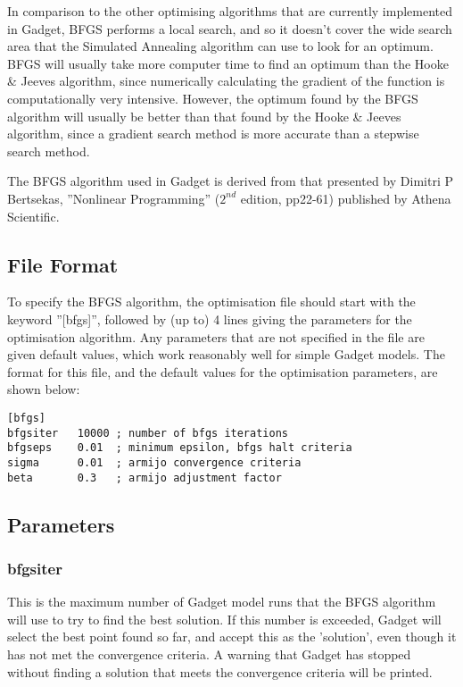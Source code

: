 \documentclass[10pt,twoside]{book}
\begin{document}
\bigskip
In comparison to the other optimising algorithms that are currently implemented in Gadget, BFGS performs a local search, and so it doesn't cover the wide search area that the Simulated Annealing algorithm can use to look for an optimum.  BFGS will usually take more computer time to find an optimum than the Hooke \& Jeeves algorithm, since numerically calculating the gradient of the function is computationally very intensive.  However, the optimum found by the BFGS algorithm will usually be better than that found by the Hooke \& Jeeves algorithm, since a gradient search method is more accurate than a stepwise search method.

\bigskip
The BFGS algorithm used in Gadget is derived from that presented by Dimitri P Bertsekas, ''Nonlinear Programming'' ($2^{nd}$ edition, pp22-61) published by Athena Scientific.

\subsection{File Format}\label{subsec:bfgsfile}
To specify the BFGS algorithm, the optimisation file should start with the keyword ''[bfgs]'', followed by (up to) 4 lines giving the parameters for the optimisation algorithm.  Any parameters that are not specified in the file are given default values, which work reasonably well for simple Gadget models.  The format for this file, and the default values for the optimisation parameters, are shown below:

{\small\begin{verbatim}
[bfgs]
bfgsiter   10000 ; number of bfgs iterations
bfgseps    0.01  ; minimum epsilon, bfgs halt criteria
sigma      0.01  ; armijo convergence criteria
beta       0.3   ; armijo adjustment factor
\end{verbatim}}

\subsection{Parameters}\label{subsec:bfgspar}
\subsubsection{bfgsiter}
This is the maximum number of Gadget model runs that the BFGS algorithm will use to try to find the best solution.  If this number is exceeded, Gadget will select the best point found so far, and accept this as the 'solution', even though it has not met the convergence criteria.  A warning that Gadget has stopped without finding a solution that meets the convergence criteria will be printed.
\end{document}
